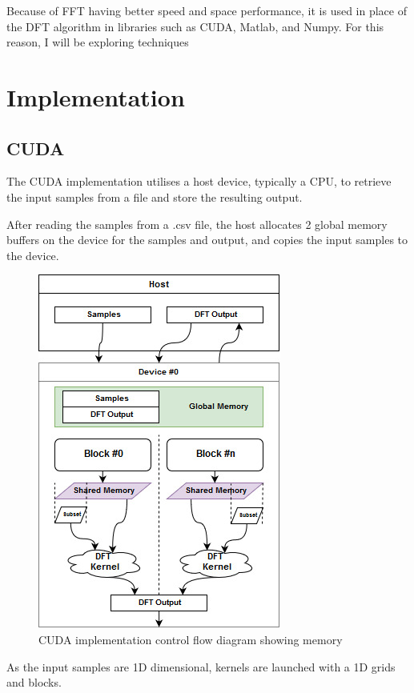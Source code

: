 \documentclass[11pt,a4paper]{article}
\begin{document}
Because of FFT having better speed and space performance, it is used in place of the DFT algorithm in libraries such as CUDA, Matlab, and Numpy. For this reason, I will be exploring techniques 

\section{Implementation}

\subsection{CUDA}
The CUDA implementation utilises a host device, typically a CPU, to retrieve the input samples from a file and store the resulting output. 

After reading the samples from a .csv file, the host allocates 2 global memory buffers on the device for the samples and output, and copies the input samples to the device. 

\begin{figure}
\begin{center}
\includegraphics[scale=0.6]{cuda_impl1}
\end{center}
\caption{CUDA implementation control flow diagram showing memory }
\label{fig:cuda_impl1}
\end{figure}

As the input samples are 1D dimensional, kernels are launched with a 1D grids and blocks. 
\end{document}
